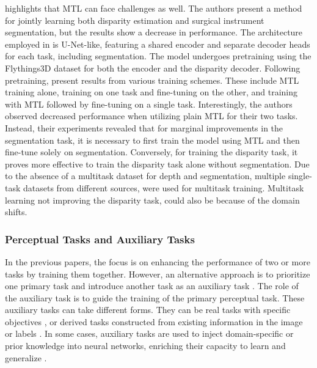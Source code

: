 \citet{msdesis} highlights that MTL can face challenges as well. The authors present a method for jointly learning both disparity estimation and surgical instrument segmentation, but the results show a decrease in performance.
The architecture employed in \citet{msdesis} is U-Net-like, featuring a shared encoder and separate decoder heads for each task, including segmentation. The model undergoes pretraining using the Flythings3D dataset \citep{MIFDB16} for both the encoder and the disparity decoder.
Following pretraining, \citet{msdesis} present results from various training schemes. These include MTL training alone, training on one task and fine-tuning on the other, and training with MTL followed by fine-tuning on a single task.
Interestingly, the authors observed decreased performance when utilizing plain MTL for their two tasks. Instead, their experiments revealed that for marginal improvements in the segmentation task, it is necessary to first train the model using MTL and then fine-tune solely on segmentation. Conversely, for training the disparity task, it proves more effective to train the disparity task alone without segmentation. Due to the absence of a multitask dataset for depth and segmentation, multiple single-task datasets from different sources, were used for multitask training. Multitask learning not improving the disparity task, could also be because of the domain shifts.



\subsubsection{Perceptual Tasks and Auxiliary Tasks}
In the previous papers, the focus is on enhancing the performance of two or more tasks by training them together.
However, an alternative approach is to prioritize one primary task and introduce another task as an auxiliary task \citep{multi_contour,multi_HOG,ss_depth_estimation_laparo,landmark_detection_submucosal}.
The role of the auxiliary task is to guide the training of the primary perceptual task.
These auxiliary tasks can take different forms. They can be real tasks with specific objectives \citep{ss_depth_estimation_laparo}, or derived tasks constructed from existing information in the image or labels \citep{landmark_detection_submucosal,multi_HOG,multi_contour}. In some cases, auxiliary tasks are used to inject domain-specific or prior knowledge into neural networks, enriching their capacity to learn and generalize \citep{landmark_detection_submucosal,ss_depth_estimation_laparo}.


